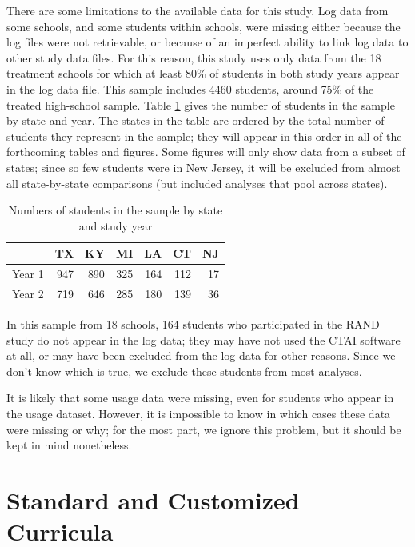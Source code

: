\documentclass[notitlepage,12pt]{jedm}\usepackage[]{graphicx}\usepackage[]{color}
\begin{document}
There are some limitations to the available data for this study.
Log data from some schools, and some students within schools, were
missing either because the log files were not retrievable, or because
of an imperfect ability to link log data to other study data files.
For this reason, this study uses only data from the
18 treatment schools for which at least
80\%
of students in both study years appear in the log data file.
This sample includes 4460 students, around
75\%
of the treated high-school sample.
Table \ref{tab:nByState} gives the number of students in the sample by
state and year.
The states in the table are ordered by the total number of students
they represent in the sample; they will appear in this order in
all of the forthcoming tables and figures.
Some figures will only show data from a subset of states; since so few
students were in New Jersey, it will be excluded from almost all
state-by-state comparisons (but included analyses that pool across states).
\begin{table}[ht]
\centering
\begin{tabular}{rrrrrrr}
  \hline
 & TX & KY & MI & LA & CT & NJ \\ 
  \hline
Year 1 & 947 & 890 & 325 & 164 & 112 &  17 \\ 
  Year 2 & 719 & 646 & 285 & 180 & 139 &  36 \\ 
   \hline
\end{tabular}
\caption{Numbers of students in the sample by state and study year} 
\label{tab:nByState}
\end{table}


In this sample from 18 schools, 164
students who participated in the RAND study do not appear in the log data; they may have not used the CTAI
software at all, or may have been excluded from the log data for other
reasons.
Since we don't know which is true, we exclude these students from most
analyses.

It is likely that some usage data were missing, even for students who
appear in the usage dataset.
However, it is impossible to know in which cases these data were
missing or why; for the most part, we ignore this problem, but it
should be kept in mind nonetheless.

\section{Standard and Customized Curricula}\label{sec:curricula}
\end{document}
